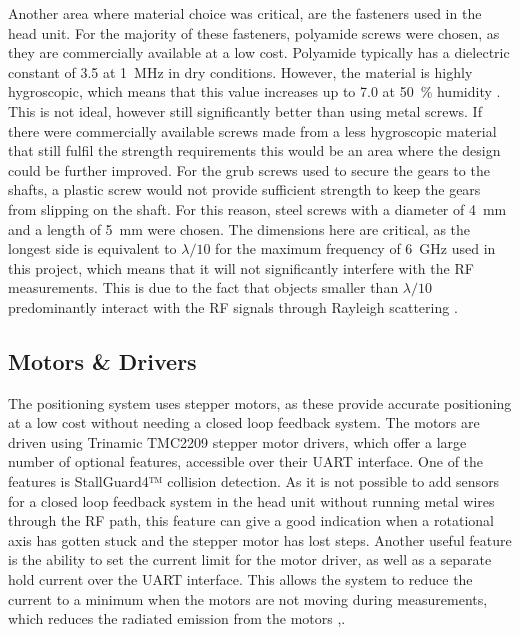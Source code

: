 Another area where material choice was critical, are the fasteners used in the head unit. For the majority of these fasteners, polyamide screws were chosen, as they are commercially available at a low cost. Polyamide typically has a dielectric constant of 3.5 at \SI{1}{\mega\hertz} in dry conditions. However, the material is highly hygroscopic, which means that this value increases up to 7.0 at \SI{50}{\percent} humidity \cite{rolec_gehause-systeme_gmbh_polyamid_pa6_en-_nodate}. This is not ideal, however still significantly better than using metal screws. If there were commercially available screws made from a less hygroscopic material that still fulfil the strength requirements this would be an area where the design could be further improved. For the grub screws used to secure the gears to the shafts, a plastic screw would not provide sufficient strength to keep the gears from slipping on the shaft. For this reason, steel screws with a diameter of \SI{4}{\milli\metre} and a length of \SI{5}{\milli\metre} were chosen. The dimensions here are critical, as the longest side is equivalent to $\lambda/10$ for the maximum frequency of \SI{6}{\giga\hertz} used in this project, which means that it will not significantly interfere with the RF measurements. This is due to the fact that objects smaller than $\lambda/10$ predominantly interact with the RF signals through Rayleigh scattering \cite{nave_blue_nodate}.
																			
\subsection{Motors \& Drivers}
The positioning system uses stepper motors, as these provide accurate positioning at a low cost without needing a closed loop feedback system. The motors are driven using Trinamic TMC2209 stepper motor drivers, which offer a large number of optional features, accessible over their UART interface. One of the features is StallGuard4™ collision detection. As it is not possible to add sensors for a closed loop feedback system in the head unit without running metal wires through the RF path, this feature can give a good indication when a rotational axis has gotten stuck and the stepper motor has lost steps. Another useful feature is the ability to set the current limit for the motor driver, as well as a separate hold current over the UART interface. This allows the system to reduce the current to a minimum when the motors are not moving during measurements, which reduces the radiated emission from the motors \cite{trinamic_motion_control_gmbh__co_kg_tc2209_2016},\cite{trinamic_motion_control_gmbh__co_kg_-015_2015}.

